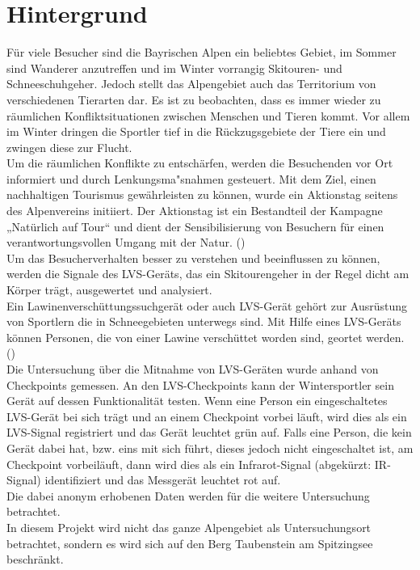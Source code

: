\documentclass[12pt]{scrreprt}
\begin{document}
\chapter{Hintergrund}

Für viele Besucher sind die Bayrischen Alpen ein beliebtes Gebiet, im Sommer sind Wanderer anzutreffen und im Winter vorrangig Skitouren- und Schneeschuhgeher. Jedoch stellt das Alpengebiet auch das Territorium von verschiedenen Tierarten dar. Es ist zu beobachten, dass es immer wieder zu räumlichen Konfliktsituationen zwischen Menschen und Tieren kommt. Vor allem im Winter dringen die Sportler tief in die Rückzugsgebiete der Tiere ein und zwingen diese zur Flucht. \\
Um die räumlichen Konflikte zu entschärfen, werden die Besuchenden vor Ort informiert und durch Lenkungsma"snahmen gesteuert. Mit dem Ziel, einen nachhaltigen Tourismus gewährleisten zu können, wurde ein Aktionstag seitens des Alpenvereins initiiert. Der Aktionstag ist ein Bestandteil der Kampagne „Natürlich auf Tour“ und dient der Sensibilisierung von Besuchern für einen verantwortungsvollen Umgang mit der Natur. 
(\cite{Alpenverein}) \\
Um das Besucherverhalten besser zu verstehen und beeinflussen zu können, werden die Signale des LVS-Geräts, das ein Skitourengeher in der Regel dicht am Körper trägt, ausgewertet und analysiert. \\
Ein Lawinenverschüttungssuchgerät oder auch LVS-Gerät gehört zur Ausrüstung von Sportlern die in Schneegebieten unterwegs sind. Mit Hilfe eines LVS-Geräts können Personen, die von einer Lawine verschüttet worden sind, geortet werden. (\cite{schweizerlawinen}) \\
Die Untersuchung über die Mitnahme von LVS-Geräten wurde anhand von Checkpoints gemessen. An den LVS-Checkpoints kann der Wintersportler sein Gerät auf dessen Funktionalität testen. Wenn eine Person ein eingeschaltetes LVS-Gerät bei sich trägt und an einem Checkpoint vorbei läuft, wird dies als ein LVS-Signal registriert und das Gerät leuchtet grün auf. Falls eine Person, die kein Gerät dabei hat, bzw. eins mit sich führt, dieses jedoch nicht eingeschaltet ist, am Checkpoint vorbeiläuft, dann wird dies als ein Infrarot-Signal (abgekürzt: IR-Signal) identifiziert und das Messgerät leuchtet rot auf. \\
Die dabei anonym erhobenen Daten werden für die weitere Untersuchung betrachtet. \\
In diesem Projekt wird nicht das ganze Alpengebiet als Untersuchungsort betrachtet, sondern es wird sich auf den Berg Taubenstein am Spitzingsee beschränkt. \\
\end{document}
